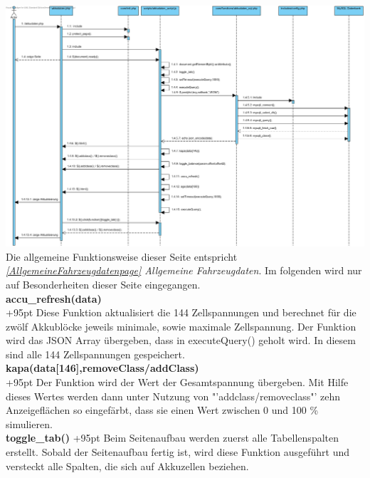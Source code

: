 \documentclass[fontsize = 12pt, paper = a4]{scrreprt}
\begin{document}
\includegraphics[scale=0.4255]{akkudatenvpp.png}
Die allgemeine Funktionsweise dieser Seite entspricht \textit{\ref{AllgemeineFahrzeugdatenpage} Allgemeine Fahrzeugdaten}. Im folgenden wird nur auf Besonderheiten dieser Seite eingegangen.\\

\textbf{accu\_refresh(data)}\\

\hangindent+95pt  
Diese Funktion aktualisiert die 144 Zellspannungen und berechnet für die zwölf Akkublöcke jeweils minimale, sowie maximale Zellspannung. Der Funktion wird das JSON Array übergeben, dass in executeQuery() geholt wird. In diesem sind alle 144 Zellspannungen gespeichert.\\


\textbf{kapa(data[146],removeClass/addClass)}\\
\hangindent+95pt  
Der Funktion wird der Wert der Gesamtspannung übergeben. Mit Hilfe dieses Wertes werden dann unter Nutzung von "'addclass/removeclass"' zehn Anzeigeflächen so eingefärbt, dass sie einen Wert zwischen 0 und 100 \% simulieren.\\

\textbf{toggle\_tab()}
\hspace{5.8mm}
\hangindent+95pt  
Beim Seitenaufbau werden zuerst alle Tabellenspalten erstellt. Sobald der Seitenaufbau fertig ist, wird diese Funktion ausgeführt und versteckt alle Spalten, die sich auf Akkuzellen beziehen.\\
\end{document}
